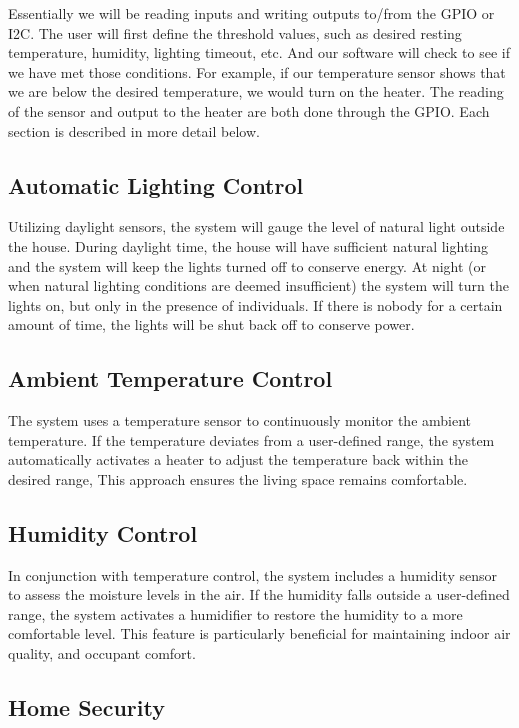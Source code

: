 \documentclass[]{report}
\begin{document}
Essentially we will be reading inputs and writing outputs to/from the GPIO or I2C. The user will first define the threshold values, such as desired resting temperature, humidity, lighting timeout, etc. And our software will check to see if we have met those conditions. For example, if our temperature sensor shows that we are below the desired temperature, we would turn on the heater. The reading of the sensor and output to the heater are both done through the GPIO. Each section is described in more detail below.

\subsection*{Automatic Lighting Control}

Utilizing daylight sensors, the system will gauge the level of natural light outside the house. During daylight time, the house will have sufficient natural lighting and the system will keep the lights turned off to conserve energy. At night (or when natural lighting conditions are deemed insufficient) the system will turn the lights on, but only in the presence of individuals. If there is nobody for a certain amount of time, the lights will be shut back off to conserve power.

\subsection*{Ambient Temperature Control}

The system uses a temperature sensor to continuously monitor the ambient temperature. If the temperature deviates from a user-defined range, the system automatically activates a heater to adjust the temperature back within the desired range, This approach ensures the living space remains comfortable. 

\subsection*{Humidity Control}

In conjunction with temperature control, the system includes a humidity sensor to assess the moisture levels in the air. If the humidity falls outside a user-defined range, the system activates a humidifier to restore the humidity to a more comfortable level. This feature is particularly beneficial for maintaining indoor air quality, and occupant comfort.

\subsection*{Home Security}
\end{document}
